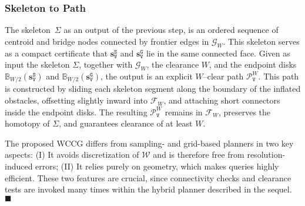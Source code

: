 \subsubsection{Skeleton to Path}
The {skeleton}~$\Sigma$ as an output of the previous step,
is an ordered sequence of centroid and bridge nodes connected by frontier
edges in $\mathcal{G}_W$. This skeleton serves as a compact certificate that
$\mathbf{s}_\texttt{V}^{\texttt{S}}$ and $\mathbf{s}_\texttt{V}^{\texttt{G}}$
lie in the same connected face. Given as input the skeleton $\Sigma$, together
with $\mathcal{G}_W$, the clearance $W$, and the endpoint disks
$\mathbb{B}_{W/2}(\mathbf{s}_\texttt{V}^{\texttt{S}})$ and
$\mathbb{B}_{W/2}(\mathbf{s}_\texttt{V}^{\texttt{G}})$, the output is an explicit
$W$--clear path $\mathcal{P}^W_\texttt{V}$. This path is constructed by sliding
each skeleton segment along the boundary of the inflated obstacles, offsetting
slightly inward into $\mathcal{F}_W$, and attaching short connectors inside the
endpoint disks. The resulting $\mathcal{P}^W_\texttt{V}$ remains in
$\mathcal{F}_W$, preserves the homotopy of $\Sigma$, and guarantees clearance of
at least $W$.


\begin{remark}\label{remark:wccg}
  The proposed WCCG differs from sampling- and grid-based planners in two key aspects:
  (I) It avoids discretization of $\mathcal{W}$ and is therefore free from
  resolution-induced errors;
  (II) It relies purely on geometry, which makes
queries highly efficient. These two features are crucial, since connectivity
checks and clearance tests are invoked many times within the hybrid
planner described in the sequel. \hfill$\blacksquare$
\end{remark}





